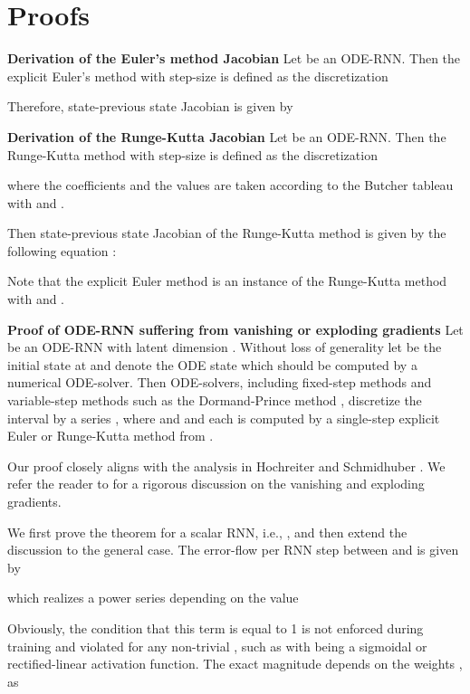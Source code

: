 \documentclass{article}
\newcommand{\beginsupplement}{\setcounter{table}{0}
\renewcommand{\thetable}{S\arabic{table}}\setcounter{algorithm}{0}
\renewcommand{\thealgorithm}{S\arabic{algorithm}}\setcounter{equation}{0}
\renewcommand{\theequation}{S\arabic{equation}}\setcounter{figure}{0}
\renewcommand{\thefigure}{S\arabic{figure}}\setcounter{section}{0}
        \renewcommand{\thesection}{S\arabic{section}}}
\begin{document}
\clearpage

\beginsupplement


\section{Proofs}
\textbf{Derivation of the Euler's method Jacobian}
Let  be an ODE-RNN. 
Then the explicit Euler's method with step-size  is defined as the discretization 

Therefore, state-previous state Jacobian is given by

    

\textbf{Derivation of the Runge-Kutta Jacobian}
Let  be an ODE-RNN. 
Then the Runge-Kutta method with step-size  is defined as the discretization 

where the coefficients  and the values  are taken according to the Butcher tableau with  and .

Then state-previous state Jacobian of the Runge-Kutta method  is given by the following equation :
    

Note that the explicit Euler method is an instance of the Runge-Kutta method with  and .

\textbf{Proof of ODE-RNN suffering from vanishing or exploding gradients}
Let  be an ODE-RNN with latent dimension . Without loss of generality let  be the initial state at  and  denote the ODE state which should be computed by a numerical ODE-solver.
Then ODE-solvers, including fixed-step methods \cite{runge1895numerische} and variable-step methods such as the Dormand-Prince method \cite{dormand1980family}, discretize the interval  by a series , where  and  and each  is computed by a single-step explicit Euler or Runge-Kutta method from . 

Our proof closely aligns with the analysis in Hochreiter and Schmidhuber \cite{hochreiter1997long}. We refer the reader to \cite{hochreiter1991untersuchungen,bengio1994learning,pascanu2013difficulty} for a rigorous discussion on the vanishing and exploding gradients. 

We first prove the theorem for a scalar RNN, i.e., , and then extend the discussion to the general case.
The error-flow per RNN step between  and  is given by

which realizes a power series depending on the value 

Obviously, the condition that this term is equal to 1 is not enforced during training and violated for any non-trivial , such as  with  being a sigmoidal or rectified-linear activation function. The exact magnitude depends on the weights , as
\end{document}
